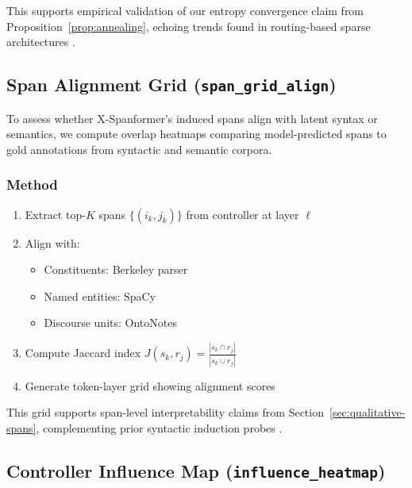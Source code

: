 This supports empirical validation of our entropy convergence claim from Proposition~\ref{prop:annealing}, echoing trends found in routing-based sparse architectures \cite{tay2020sparse, shazeer2017outrageously}.









\subsection{Span Alignment Grid (\texttt{span\_grid\_align})}
\label{sec:vis-align}

To assess whether X-Spanformer’s induced spans align with latent syntax or semantics, we compute overlap heatmaps comparing model-predicted spans to gold annotations from syntactic and semantic corpora.

\subsubsection*{Method}

\begin{enumerate}[leftmargin=1.5em]
  \item Extract top-$K$ spans \( \{(i_k, j_k)\} \) from controller at layer \( \ell \)
  \item Align with:
  \begin{itemize}
    \item Constituents: Berkeley parser \cite{kitaev2018constituency}
    \item Named entities: SpaCy \cite{honnibal2017spacy}
    \item Discourse units: OntoNotes \cite{weischedel2013ontonotes}
  \end{itemize}
  \item Compute Jaccard index \( J(s_k, r_j) = \frac{|s_k \cap r_j|}{|s_k \cup r_j|} \)
  \item Generate token-layer grid showing alignment scores
\end{enumerate}

This grid supports span-level interpretability claims from Section~\ref{sec:qualitative-spans}, complementing prior syntactic induction probes \cite{kim2019unsupervised}.







\subsection{Controller Influence Map (\texttt{influence\_heatmap})}
\label{sec:vis-influence}

